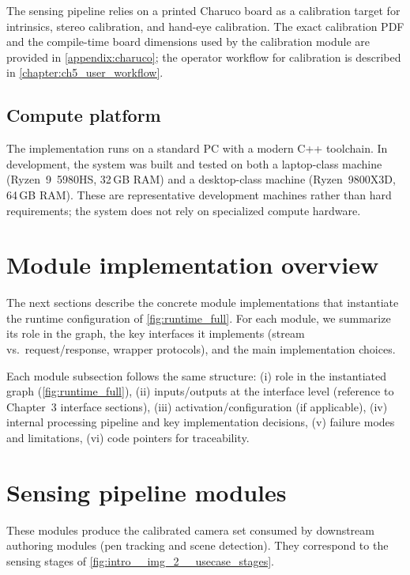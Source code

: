 The sensing pipeline relies on a printed Charuco board as a calibration target for intrinsics, stereo calibration, and hand-eye calibration.
The exact calibration PDF and the compile-time board dimensions used by the calibration module are provided in \autoref{appendix:charuco}; the operator workflow for calibration is described in \autoref{chapter:ch5_user_workflow}.

\subsection{Compute platform}
\label{subsec:ch4_hw_compute}

The implementation runs on a standard PC with a modern C++ toolchain.
In development, the system was built and tested on both a laptop-class machine (Ryzen~9~5980HS, 32\,GB RAM) and a desktop-class machine (Ryzen~9800X3D, 64\,GB RAM).
These are representative development machines rather than hard requirements; the system does not rely on specialized compute hardware.

\section{Module implementation overview}
\label{sec:ch4_module_overview}

The next sections describe the concrete module implementations that instantiate the runtime configuration of \autoref{fig:runtime_full}.
For each module, we summarize its role in the graph, the key interfaces it implements (stream vs.\ request/response, wrapper protocols), and the main implementation choices.

Each module subsection follows the same structure:
(i) role in the instantiated graph (\autoref{fig:runtime_full}),
(ii) inputs/outputs at the interface level (reference to Chapter~3 interface sections),
(iii) activation/configuration (if applicable),
(iv) internal processing pipeline and key implementation decisions,
(v) failure modes and limitations,
(vi) code pointers for traceability.

\section{Sensing pipeline modules}
\label{sec:ch4_sensing_pipeline}

These modules produce the calibrated camera set consumed by downstream authoring modules (pen tracking and scene detection).
They correspond to the sensing stages of \autoref{fig:intro__img_2__usecase_stages}.

